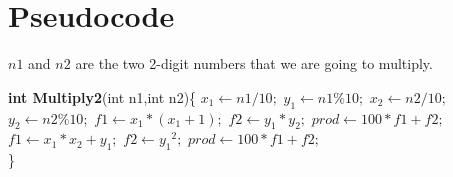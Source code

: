 \section{Pseudocode}
$n1$ and $n2$ are the two 2-digit numbers that we are going to multiply.
\begin{algorithmic}
    \State \textbf{int Multiply2}(int n1,int n2)\{
     \State$x_1 \leftarrow n1/10;$  
     \State$y_1 \leftarrow n1\%10;$
     \State$x_2 \leftarrow n2/10;$
     \State$y_2 \leftarrow n2\%10;$
     \State {}
         \State$f1\leftarrow x_1*(x_1+1);$  
         \State$f2\leftarrow y_1*y_2;$  
         \State$prod\leftarrow 100*f1+f2;$
     \EndIf
     \State {}
        \State$f1\leftarrow x_1*x_2+y_1;$
        \State$f2\leftarrow {y_1}^2;$
        \State$prod\leftarrow 100*f1+f2;$
     \EndIf
\\
\}
\end{algorithmic}
